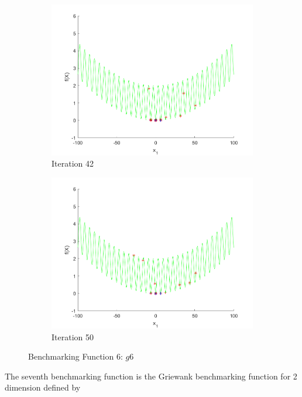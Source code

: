\begin{figure}
\begin{subfigure}[b]{0.4\textwidth}
   \includegraphics[width=\textwidth]{img/smpl/grwnk1d/loa-iter-42}
   \caption{Iteration 42}
   \label{fig:s6-iter-6}
 \end{subfigure}
 \begin{subfigure}[b]{0.4\textwidth}
   \includegraphics[width=\textwidth]{img/smpl/grwnk1d/loa-iter-50}
   \caption{Iteration 50}
   \label{fig:s6-iter-7}
 \end{subfigure}
 \caption{Benchmarking Function 6: $g6$}
\end{figure}

\par The seventh benchmarking function is the Griewank benchmarking function for 2 dimension defined by

